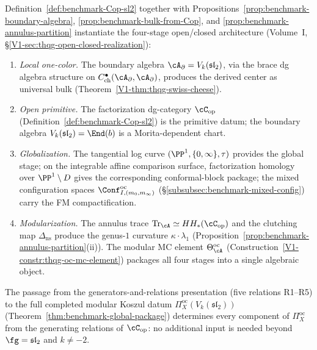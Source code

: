 \begin{remark}
\label{rem:benchmark-primitive-instantiation}
Definition~\ref{def:benchmark-Cop-sl2} together with
Propositions~\ref{prop:benchmark-boundary-algebra},
\ref{prop:benchmark-bulk-from-Cop}, and
\ref{prop:benchmark-annulus-partition} instantiate the four-stage
open/closed architecture
(Volume~I, \S\ref*{V1-sec:thqg-open-closed-realization}):
\begin{enumerate}[label=\textup{Stage \arabic*.},nosep,
 leftmargin=3em]
\item \emph{Local one-color.}
 The boundary algebra $\cA_\partial = V_k(\mathfrak{sl}_2)$,
 via the brace dg algebra structure on
 $C^\bullet_{\mathrm{ch}}(\cA_\partial, \cA_\partial)$,
 produces the derived center as universal bulk
 (Theorem~\ref*{V1-thm:thqg-swiss-cheese}).

\item \emph{Open primitive.}
 The factorization dg-category
 $\cC_{\mathrm{op}}$
 (Definition~\ref{def:benchmark-Cop-sl2})
 is the primitive datum; the boundary algebra
 $V_k(\mathfrak{sl}_2) = \End(b)$ is a Morita-dependent chart.

\item \emph{Globalization.}
 The tangential log curve
 $(\PP^1, \{0,\infty\}, \tau)$ provides the global stage;
 on the integrable affine comparison surface,
 factorization homology over $\PP^1 \setminus D$ gives the
 corresponding conformal-block package; the mixed configuration spaces
 $\Conf^{\mathrm{oc}}_{I,(m_0,m_\infty)}$
 (\S\ref{subsubsec:benchmark-mixed-config}) carry the FM
 compactification.

\item \emph{Modularization.}
 The annulus trace
 $\mathrm{Tr}_\cA \simeq HH_*(\cC_{\mathrm{op}})$ and the
 clutching map $\Delta_{\mathrm{ns}}$ produce the genus-$1$
 curvature $\kappa \cdot \lambda_1$
 (Proposition~\ref{prop:benchmark-annulus-partition}(ii)).
 The modular MC element $\Theta^{\mathrm{oc}}_\cA$
 (Construction~\ref*{V1-constr:thqg-oc-mc-element}) packages
 all four stages into a single algebraic object.
\end{enumerate}
The passage from the generators-and-relations presentation
(five relations R1--R5) to the full completed modular Koszul datum
$\Pi^{\mathrm{oc}}_X(V_k(\mathfrak{sl}_2))$
(Theorem~\ref{thm:benchmark-global-package})
determines every component of
$\Pi^{\mathrm{oc}}_X$ from the generating
relations of $\cC_{\mathrm{op}}$: no additional input is
needed beyond $\fg = \mathfrak{sl}_2$ and $k \ne -2$.
\end{remark}

